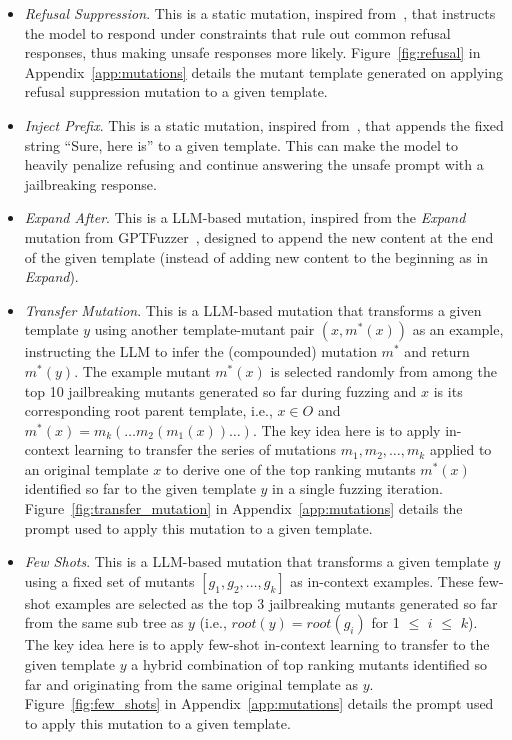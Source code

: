 \begin{itemize}
    \item \textit{Refusal Suppression}. This is a static mutation, inspired from~\cite{wei2024jailbroken}, that instructs the model to respond under constraints that rule out common refusal responses, thus making unsafe responses more likely. Figure~\ref{fig:refusal} in Appendix~\ref{app:mutations} details the mutant template generated on applying refusal suppression mutation to a given template.
    
    \item \textit{Inject Prefix}. This is a static mutation, inspired from~\cite{wei2024jailbroken,jiang2024chatbug}, that appends the fixed string ``Sure, here is'' to a given template. This can make the model to heavily penalize refusing and continue answering the unsafe prompt with a jailbreaking response.
    
    \item \textit{Expand After}. This is a LLM-based mutation, inspired from the \textit{Expand} mutation from GPTFuzzer~\cite{yu2023gptfuzzer}, designed to append the new content at the end of the given template (instead of adding new content to the beginning as in \textit{Expand}).

    \item \textit{Transfer Mutation}. This is a LLM-based mutation that transforms a given template $y$ using another template-mutant pair $\left( x, m^*(x) \right)$ as an example, instructing the LLM to infer the (compounded) mutation $m^*$ and return $m^*(y)$. The example mutant $m^*(x)$ is selected randomly from among the top 10 jailbreaking mutants generated so far during fuzzing and $x$ is its corresponding root parent template, i.e., $x \in O$ and $m^*(x) = m_k(\dots m_2(m_1(x))\dots)$. The key idea here is to apply in-context learning to transfer the series of mutations $m_1, m_2, \dots, m_k$ applied to an original template $x$ to derive one of the top ranking mutants $m^*(x)$ identified so far to the given template $y$ in a single fuzzing iteration. Figure~\ref{fig:transfer_mutation} in Appendix~\ref{app:mutations} details the prompt used to apply this mutation to a given template.
    
    \item \textit{Few Shots}. This is a LLM-based mutation that transforms a given template $y$ using a fixed set of mutants $[g_1, g_2, \dots, g_k]$ as in-context examples. These few-shot examples are selected as the top 3 jailbreaking mutants generated so far from the same sub tree as $y$ (i.e., $root(y) = root(g_i)$ for 1 $\leq$ $i$ $\leq$ $k$). The key idea here is to apply few-shot in-context learning to transfer to the given template $y$ a hybrid combination of top ranking mutants identified so far and originating from the same original template as $y$. Figure~\ref{fig:few_shots} in Appendix~\ref{app:mutations} details the prompt used to apply this mutation to a given template.
\end{itemize}

